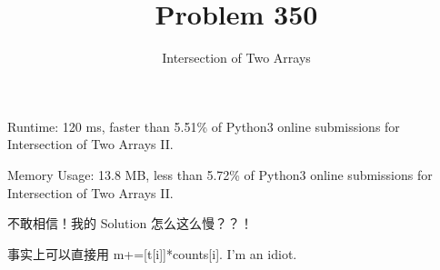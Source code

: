 \documentclass[UTF8]{ctexart}
\title{Problem 350}
\author{Intersection of Two Arrays}
\begin{document}
\maketitle

Runtime: 120 ms, faster than 5.51\% of Python3 online submissions for Intersection of Two Arrays II.

Memory Usage: 13.8 MB, less than 5.72\% of Python3 online submissions for Intersection of Two Arrays II.

不敢相信！我的 Solution 怎么这么慢？？！

事实上可以直接用 m+=[t[i]]*counts[i]. I'm an idiot.
\end{document}
